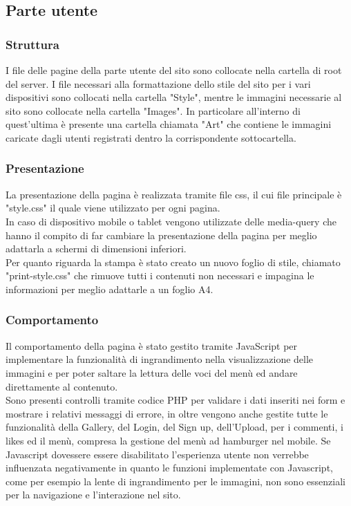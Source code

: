\documentclass[openany, a4paper, 12pt]{report}
\begin{document}
		\subsection{Parte utente}
			\subsubsection{Struttura}
			I file delle pagine della parte utente del sito sono collocate nella cartella di root del server. I file necessari alla formattazione dello stile del sito per i vari dispositivi sono collocati nella cartella "Style", mentre le immagini necessarie al sito sono collocate nella cartella "Images". In particolare all'interno di quest'ultima è presente una cartella chiamata "Art" che contiene le immagini caricate dagli utenti registrati dentro la corrispondente sottocartella.
			\subsubsection{Presentazione}
			La presentazione della pagina è realizzata tramite file css, il cui file principale è "style.css" il quale viene utilizzato per ogni pagina.\\
			In caso di dispositivo mobile o tablet vengono utilizzate delle media-query che hanno il compito di far cambiare la presentazione della pagina per meglio adattarla a schermi di dimensioni inferiori.\\
			Per quanto riguarda la stampa è stato creato un nuovo foglio di stile, chiamato "print-style.css" che rimuove tutti i contenuti non necessari e impagina le informazioni per meglio adattarle a un foglio A4. 
		
			\subsubsection{Comportamento}
			Il comportamento della pagina è stato gestito tramite JavaScript per implementare la funzionalità di ingrandimento nella visualizzazione delle immagini e per poter saltare la lettura delle voci del menù ed andare direttamente al contenuto.\\
			Sono presenti controlli tramite codice PHP per validare i dati inseriti nei form e mostrare i relativi messaggi di errore, in oltre vengono anche gestite tutte le funzionalità della Gallery, del Login, del Sign up, dell'Upload, per i commenti, i likes ed il menù, compresa la gestione del menù ad hamburger nel mobile. Se Javascript dovessere essere disabilitato l'esperienza utente non verrebbe influenzata negativamente in quanto le funzioni implementate con Javascript, come per esempio la lente di ingrandimento per le immagini, non sono essenziali per la navigazione e l'interazione nel sito.
\end{document}
